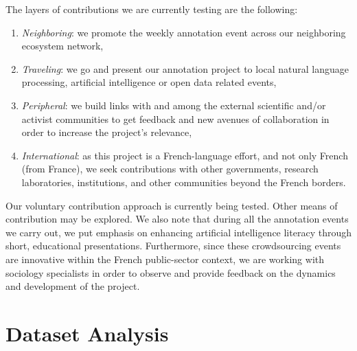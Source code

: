 \documentclass[10pt, a4paper]{article}
\begin{document}
The layers of contributions we are currently testing are the following:

\begin{enumerate}
\item \textit{Neighboring}: we promote the weekly annotation event across our neighboring ecosystem network,
\item \textit{Traveling}: we go and present our annotation project to local natural language processing, artificial intelligence or open data related events,
\item \textit{Peripheral}: we build links with and among the external scientific and/or activist communities to get feedback and new avenues of collaboration in order to increase the project's relevance,
\item \textit{International}: as this project is a French-language effort, and not only French (from France), we seek contributions with other governments, research laboratories, institutions, and other communities beyond the French borders.
\end{enumerate}

Our voluntary contribution approach is currently being tested. Other means of contribution may be explored. We also note that during all the annotation events we carry out, we put emphasis on enhancing artificial intelligence literacy through short, educational presentations. Furthermore, since these crowdsourcing events are innovative within the French public-sector context, we are working with sociology specialists in order to observe and provide feedback on the dynamics and development of the project.

\section{Dataset Analysis}
\label{sec:analysis}
\end{document}
